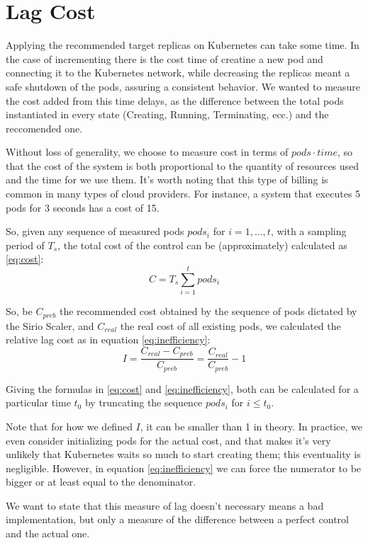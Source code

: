 \section{Lag Cost}
\label{sec:lag_cost}
Applying the recommended target replicas on Kubernetes can take some time. In the case of incrementing there is the cost time of creatine a new pod and connecting it to the Kubernetes network, while decreasing the replicas meant a safe shutdown of the pods, assuring a consistent behavior. We wanted to measure the cost added from this time delays, as the difference between the total pods instantiated in every state (Creating, Running, Terminating, ecc.) and the reccomended one.

Without loss of generality, we choose to measure cost in terms of $pods \cdot time$, so that the cost of the system is both proportional to the quantity of resources used and the time for we use them. It's worth noting that this type of billing is common in many types of cloud providers. For instance, a system that executes 5 pods for 3 seconds has a cost of 15.

So, given any sequence of measured pods $pods_i$ for $i=1,\dots,t$, with a sampling period of $T_s$, the total cost of the control can be (approximately) calculated as \ref{eq:cost}:
\begin{equation}
    \label{eq:cost}
    C = T_s\sum_{i=1}^{t}pods_i
\end{equation}

So, be $C_{preb}$ the recommended cost obtained by the sequence of pods dictated by the Sirio Scaler, and $C_{real}$ the real cost of all existing pods, we calculated the relative lag cost as in equation \ref{eq:inefficiency}:
\begin{equation}
    \label{eq:inefficiency}
    I =\frac{C_{real} - C_{preb}}{C_{preb}} = \frac{C_{real}}{C_{preb}} - 1
\end{equation}

Giving the formulas in \ref{eq:cost} and \ref{eq:inefficiency}, both can be calculated for a particular time $t_0$ by truncating the sequence $pods_i$ for $i\leq t_0$.

Note that for how we defined $I$, it can be smaller than 1 in theory. In practice, we even consider initializing pods for the actual cost, and that makes it's very unlikely that Kubernetes waits so much to start creating them; this eventuality is negligible. However, in equation \ref{eq:inefficiency} we can force the numerator to be bigger or at least equal to the denominator.

We want to state that this measure of lag doesn't necessary means a bad implementation, but only a measure of the difference between a perfect control and the actual one.